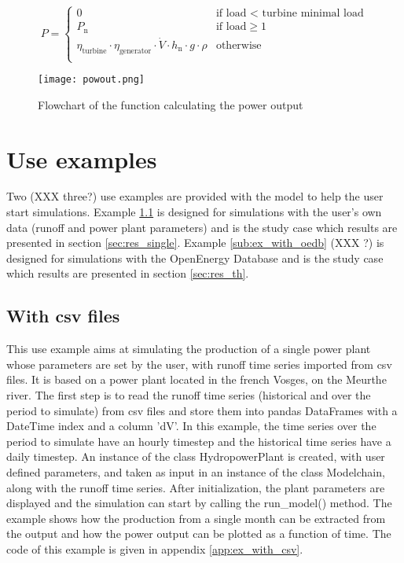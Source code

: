 \begin{equation}
  \label{eq_pow}
P= \left\{
    \begin{array}{ll}
	0 & \mbox{if load < turbine minimal load}\\
        P_\mathrm{n} & \mbox{if load}\geq 1 \\
        \eta_\mathrm{turbine} \cdot \eta_\mathrm{generator} \cdot \dot{V} \cdot h_\mathrm{n} \cdot g \cdot \rho & \mbox{otherwise}\\
    \end{array}
\right.
\end{equation}

\begin{figure}[H]
\centering
\texttt{[image: powout.png]}
\caption{Flowchart of the function calculating the power output}
\label{powout}
\end{figure}



\section{Use examples}
Two (XXX three?) use examples are provided with the model to help the user start simulations. Example \ref{sub:ex_with_csv} is designed for simulations with the user's own data (runoff and power plant parameters) and is the study case which results are presented in section \ref{sec:res_single}. Example \ref{sub:ex_with_oedb} (XXX ?) is designed for simulations with the OpenEnergy Database and is the study case which results are presented in section  \ref{sec:res_th}.

\subsection{With csv files}
\label{sub:ex_with_csv}

This use example aims at simulating the production of a single power plant whose parameters are set by the user, with runoff time series imported from csv files. It is based on a power plant located in the french Vosges, on the Meurthe river. \newline
The first step is to read the runoff time series (historical and over the period to simulate) from csv files and store them into pandas DataFrames with a DateTime index and a column 'dV'.
In this example, the time series over the period to simulate have an hourly timestep and the historical time series have a daily timestep. An instance of the class HydropowerPlant is created, with user defined parameters, and taken as input in an instance of the class Modelchain, along with the runoff time series. \newline
After initialization, the plant parameters are displayed and the simulation can start by calling the run{\_}model() method. The example shows how the production from a single month can be extracted from the output and how the power output can be plotted as a function of time. \newline
The code of this example is given in appendix \ref{app:ex_with_csv}.

